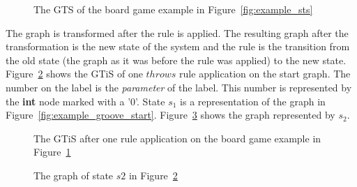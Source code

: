 \begin{figure}[h!]
  \begin{center}
    \quad
  \end{center}
  \caption{The GTS of the board game example in Figure~\ref{fig:example_sts}}
  \label{fig:example_groove}
\end{figure}

The graph is transformed after the rule is applied. The resulting graph after the transformation is the new state of the system and the rule is the transition from the old state (the graph as it was before the rule was applied) to the new state. Figure~\ref{fig:gtis_example} shows the GTiS of one $throws$ rule application on the start graph. The number on the label is the \textit{parameter} of the label. This number is represented by the \textbf{int} node marked with a '0'. State $s_1$ is a representation of the graph in Figure~\ref{fig:example_groove_start}. Figure~\ref{fig:target_graph_state} shows the graph represented by $s_2$. 

\begin{figure}[h!]
  \begin{center}
    
  \end{center}
  \caption{The GTiS after one rule application on the board game example in Figure~\ref{fig:example_groove}}
  \label{fig:gtis_example}
\end{figure}

\begin{figure}[h!]
  \begin{center}
    
  \end{center}
  \caption{The graph of state $s2$ in Figure~\ref{fig:gtis_example}}
  \label{fig:target_graph_state}
\end{figure}
